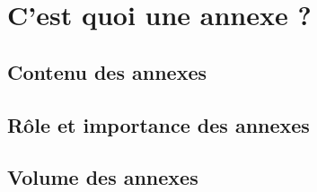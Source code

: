 \chapter{C'est quoi une annexe ?}

\section{Contenu des annexes}


\section{Rôle et importance des annexes}

\section{Volume des annexes}


